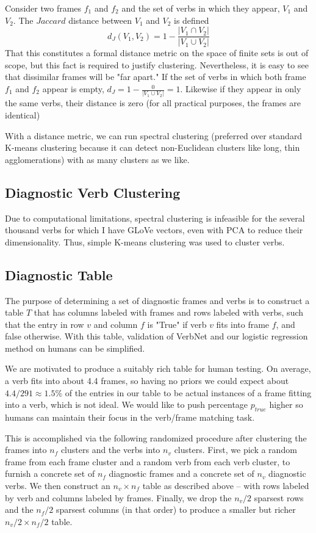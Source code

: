 \documentclass[a4paper]{article}
\begin{document}
Consider two frames $f_1$ and $f_2$ and the set of verbs in which they appear, $V_1$ and $V_2$. The $\textit{Jaccard}$ distance between $V_1$ and $V_2$ is defined
\[ d_J(V_1, V_2) =  1 - \frac{|V_1 \cap V_2|}{|V_1 \cup V_2|} \]
That this constitutes a formal distance metric on the space of finite sets is out of scope, but this fact is required to justify clustering. Nevertheless, it is easy to see that dissimilar frames will be "far apart." If the set of verbs in which both frame $f_1$ and $f_2$ appear is empty,  $d_J = 1 - \frac{0}{|V_1 \cup V_2|} = 1$. Likewise if they appear in only the same verbs, their distance is zero (for all practical purposes, the frames are identical)

With a distance metric, we can run spectral clustering (preferred over standard K-means clustering because it can detect non-Euclidean clusters like long, thin agglomerations) with as many clusters as we like.

\subsection{Diagnostic Verb Clustering}

Due to computational limitations, spectral clustering is infeasible for the several thousand verbs for which I have GLoVe vectors, even with PCA to reduce their dimensionality. Thus, simple K-means clustering was used to cluster verbs. 

\subsection{Diagnostic Table}

The purpose of determining a set of diagnostic frames and verbs is to construct a table $T$ that has columns labeled with frames and rows labeled with verbs, such that the entry in row $v$ and column $f$ is "True" if verb $v$ fits into frame $f$, and false otherwise. With this table, validation of VerbNet and our logistic regression method on humans can be simplified.

We are motivated to produce a suitably rich table for human testing. On average, a verb fits into about 4.4 frames, so having no priors we could expect about $4.4/291 \approx 1.5\%$ of the entries in our table to be actual instances of a frame fitting into a verb, which is not ideal. We would like to push percentage $p_{true}$  higher so humans can maintain their focus in the verb/frame matching task. 

This is accomplished via the following randomized procedure after clustering the frames into $n_f$ clusters and the verbs into $n_v$ clusters. First, we pick a random frame from each frame cluster and a random verb from each verb cluster, to furnish a concrete set of $n_f$ diagnostic frames and a concrete set of $n_v$ diagnostic verbs. We then construct an $n_v \times n_f$ table as described above -- with rows labeled by verb and columns labeled by frames. Finally, we drop the $n_v / 2$ sparsest rows and the $n_f/2$ sparsest columns (in that order) to produce a smaller but richer $n_v/2 \times n_f/2$ table.
\end{document}
